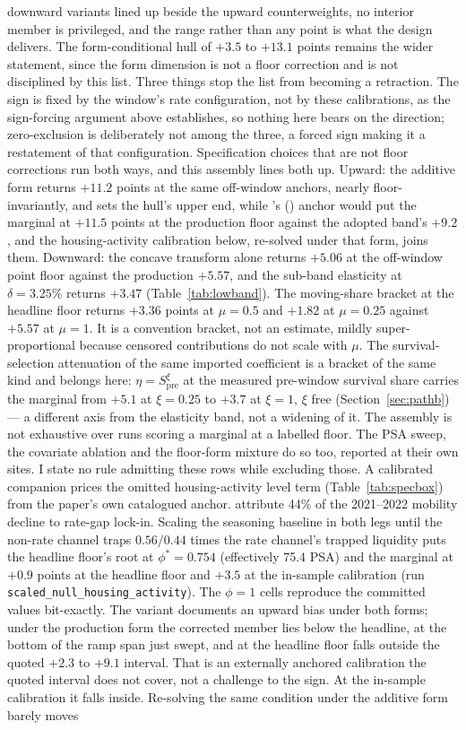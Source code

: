 \documentclass[12pt]{article}
\newcommand{\citepos}[1]{\citeauthor{#1}'s (\citeyear{#1})}
\begin{document}
downward variants lined up beside the upward counterweights, no interior member is privileged, and the range rather than any point is what the design delivers. The form-conditional hull of $+3.5$ to $+13.1$ points remains the wider statement, since the form dimension is not a floor correction and is not disciplined by this list. Three things stop the list from becoming a retraction. The sign is fixed by the window's rate configuration, not by these calibrations, as the sign-forcing argument above establishes, so nothing here bears on the direction; zero-exclusion is deliberately not among the three, a forced sign making it a restatement of that configuration. Specification choices that are not floor corrections run both ways, and this assembly lines both up. Upward: the additive form returns $+11.2$ points at the same off-window anchors, nearly floor-invariantly, and sets the hull's upper end, while \citepos{fonseca2024} anchor would put the marginal at $+11.5$ points at the production floor against the adopted band's $+9.2$, and the housing-activity calibration below, re-solved under that form, joins them. Downward: the concave transform alone returns $+5.06$ at the off-window point floor against the production $+5.57$, and the sub-band elasticity at $\delta = 3.25\%$ returns $+3.47$ (Table~\ref{tab:lowband}). The moving-share bracket at the headline floor returns $+3.36$ points at $\mu = 0.5$ and $+1.82$ at $\mu = 0.25$ against $+5.57$ at $\mu = 1$. It is a convention bracket, not an estimate, mildly super-proportional because censored contributions do not scale with $\mu$. The survival-selection attenuation of the same imported coefficient is a bracket of the same kind and belongs here: $\eta = S_{\mathrm{pre}}^{\xi}$ at the measured pre-window survival share carries the marginal from $+5.1$ at $\xi = 0.25$ to $+3.7$ at $\xi = 1$, $\xi$ free (Section~\ref{sec:pathb}) --- a different axis from the elasticity band, not a widening of it. The assembly is not exhaustive over runs scoring a marginal at a labelled floor. The PSA sweep, the covariate ablation and the floor-form mixture do so too, reported at their own sites. I state no rule admitting these rows while excluding those. A calibrated companion prices the omitted housing-activity level term (Table~\ref{tab:specbox}) from the paper's own catalogued anchor. \citet{aladangady2024} attribute 44\% of the 2021--2022 mobility decline to rate-gap lock-in. Scaling the seasoning baseline in both legs until the non-rate channel traps $0.56/0.44$ times the rate channel's trapped liquidity puts the headline floor's root at $\phi^{*} = 0.754$ (effectively 75.4 PSA) and the marginal at $+0.9$ points at the headline floor and $+3.5$ at the in-sample calibration (run \texttt{scaled\_null\_housing\_activity}). The $\phi = 1$ cells reproduce the committed values bit-exactly. The variant documents an upward bias under both forms; under the production form the corrected member lies below the headline, at the bottom of the ramp span just swept, and at the headline floor falls outside the quoted $+2.3$ to $+9.1$ interval. That is an externally anchored calibration the quoted interval does not cover, not a challenge to the sign. At the in-sample calibration it falls inside. Re-solving the same condition under the additive form barely moves 
\end{document}
